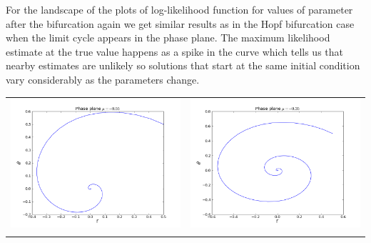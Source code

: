 For the landscape of the plots of log-likelihood function for values of parameter after the bifurcation again we get similar results as in the Hopf bifurcation case when the limit cycle appears in the phase plane. The maximum likelihood estimate at the true value happens as a spike in the curve which tells us that nearby estimates are unlikely so solutions that start at the same initial condition vary considerably as the parameters change. 
\begin{table}[ht]
\centering
\begin{tabular}{cc}
\includegraphics[scale=0.3]{phase_snic055m}&\includegraphics[scale=0.3]{phase_snic035m}\\
\newline

\end{tabular}
\end{table}
